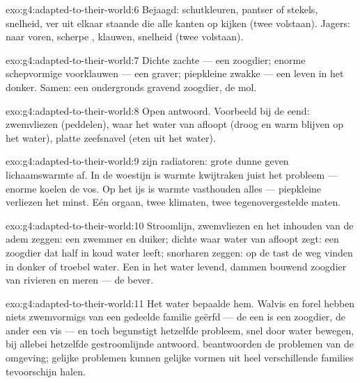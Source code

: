 \begin{solution}{exo:g4:adapted-to-their-world:6}
Bejaagd: schutkleuren, pantser of stekels, snelheid, ver uit elkaar
staande  die alle kanten op kijken (twee volstaan). Jagers: 
naar voren, scherpe , klauwen, snelheid (twee volstaan).
\end{solution}

\begin{solution}{exo:g4:adapted-to-their-world:7}
Dichte zachte  --- een zoogdier; enorme schepvormige voorklauwen
--- een graver; piepkleine zwakke  --- een leven in het donker.
Samen: een ondergronds gravend zoogdier, de mol.
\end{solution}

\begin{solution}{exo:g4:adapted-to-their-world:8}
Open antwoord. Voorbeeld bij de eend: zwemvliezen (peddelen), 
waar het water van afloopt (droog en warm blijven op het water), platte
zeefsnavel (eten uit het water).
\end{solution}

\begin{solution}{exo:g4:adapted-to-their-world:9}
 zijn radiatoren: grote dunne  geven lichaamswarmte af. In de
woestijn is warmte kwijtraken juist het probleem --- enorme  koelen
de vos. Op het ijs is warmte vasthouden alles --- piepkleine 
verliezen het minst. Eén orgaan, twee klimaten, twee tegenovergestelde
maten.
\end{solution}

\begin{solution}{exo:g4:adapted-to-their-world:10}
Stroomlijn, zwemvliezen en het inhouden van de adem zeggen: een zwemmer
en duiker; dichte  waar water van afloopt zegt: een zoogdier dat
half in koud water leeft; snorharen zeggen: op de tast de weg vinden in
donker of troebel water. Een in het water levend, dammen bouwend
zoogdier van rivieren en meren --- de bever.
\end{solution}

\begin{solution}{exo:g4:adapted-to-their-world:11}
Het water bepaalde hem. Walvis en forel hebben niets zwemvormigs van een
gedeelde familie geërfd --- de een is een zoogdier, de ander een vis ---
en toch begunstigt hetzelfde probleem, snel door water bewegen, bij
allebei hetzelfde gestroomlijnde antwoord.  beantwoorden de
problemen van de omgeving; gelijke problemen kunnen gelijke vormen uit
heel verschillende families tevoorschijn halen.
\end{solution}
